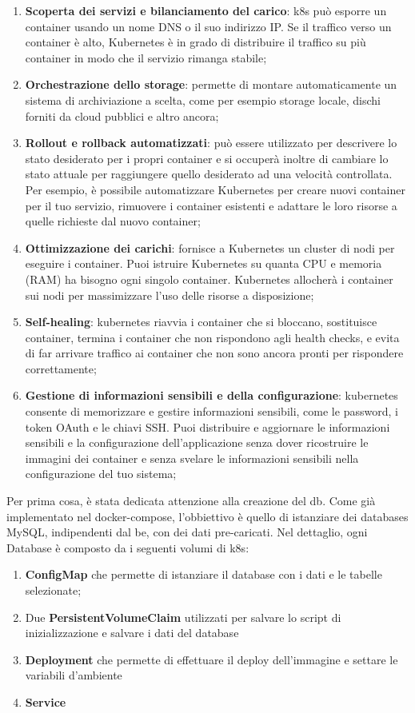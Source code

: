 \documentclass{article}
\begin{document}
\begin{enumerate} 
    \item \textbf{Scoperta dei servizi e bilanciamento del carico}: k8s può esporre un container usando un nome DNS o il suo indirizzo IP. Se il traffico verso un container è alto, Kubernetes è in grado di distribuire il traffico su più container in modo che il servizio rimanga stabile;
    \item \textbf{Orchestrazione dello storage}: permette di montare automaticamente un sistema di archiviazione a scelta, come per esempio storage locale, dischi forniti da cloud pubblici e altro ancora;
    \item \textbf{Rollout e rollback automatizzati}: può essere utilizzato per descrivere lo stato desiderato per i propri container e si occuperà inoltre di cambiare lo stato attuale per raggiungere quello desiderato ad una velocità controllata. Per esempio, è possibile automatizzare Kubernetes per creare nuovi container per il tuo servizio, rimuovere i container esistenti e adattare le loro risorse a quelle richieste dal nuovo container;
    \item \textbf{Ottimizzazione dei carichi}: fornisce a Kubernetes un cluster di nodi per eseguire i container. Puoi istruire Kubernetes su quanta CPU e memoria (RAM) ha bisogno ogni singolo container. Kubernetes allocherà i container sui nodi per massimizzare l'uso delle risorse a disposizione;
    \item \textbf{Self-healing}: kubernetes riavvia i container che si bloccano, sostituisce container, termina i container che non rispondono agli health checks, e evita di far arrivare traffico ai container che non sono ancora pronti per rispondere correttamente;
    \item \textbf{Gestione di informazioni sensibili e della configurazione}: kubernetes consente di memorizzare e gestire informazioni sensibili, come le password, i token OAuth e le chiavi SSH. Puoi distribuire e aggiornare le informazioni sensibili e la configurazione dell'applicazione senza dover ricostruire le immagini dei container e senza svelare le informazioni sensibili nella configurazione del tuo sistema;
\end{enumerate}

Per prima cosa, è stata dedicata attenzione alla creazione del db. Come già implementato nel docker-compose,
l’obbiettivo è quello di istanziare dei databases MySQL, indipendenti dal be, con dei dati pre-caricati.
Nel dettaglio, ogni Database è composto da i seguenti volumi di k8s:
\begin{enumerate}
    \item \textbf{ConfigMap} che permette di istanziare il database con i dati e le tabelle selezionate;
    \item Due \textbf{PersistentVolumeClaim} utilizzati per salvare lo script di inizializzazione e salvare i dati del database
    \item \textbf{Deployment} che permette di effettuare il deploy dell'immagine e settare le variabili d'ambiente
    \item \textbf{Service} 
\end{enumerate}
\end{document}
